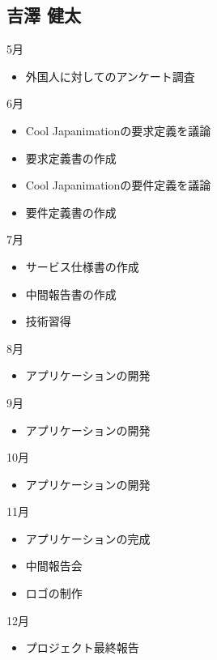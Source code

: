 \subsection{吉澤 健太}
5月
\begin{itemize}
\item 外国人に対してのアンケート調査
\end{itemize}
6月
\begin{itemize}
\item Cool Japanimationの要求定義を議論
\item 要求定義書の作成
\item Cool Japanimationの要件定義を議論
\item 要件定義書の作成
\end{itemize}
7月
\begin{itemize}
\item サービス仕様書の作成
\item 中間報告書の作成
\item 技術習得
\end{itemize}
8月
\begin{itemize}
\item アプリケーションの開発
\end{itemize}
9月
\begin{itemize}
\item アプリケーションの開発
\end{itemize}
10月
\begin{itemize}
\item アプリケーションの開発
\end{itemize}
11月
\begin{itemize}
\item アプリケーションの完成
\item 中間報告会
\item ロゴの制作
\end{itemize}
12月
\begin{itemize}
\item プロジェクト最終報告
\end{itemize}
